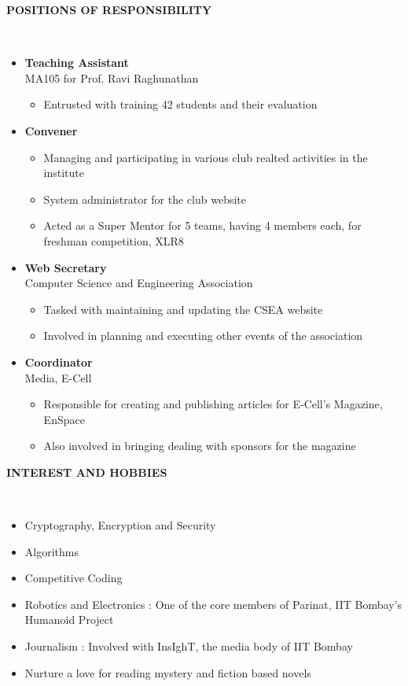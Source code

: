 \documentclass[a4paper,10pt]{article}
\newcommand{\lsep}{-0.5cm}
\newcommand{\resheading}[1]{{\small \colorbox{mygrey}{\begin{minipage}{0.975\textwidth}{\textbf{#1 \vphantom{p\^{E}}}}\end{minipage}}}}
\begin{document}
\resheading{\textbf{POSITIONS OF RESPONSIBILITY} }\\[\lsep]
\begin{itemize}\itemsep 0em
\item {\bf Teaching Assistant} \\
\hspace*{5mm} MA105 for Prof. Ravi Raghunathan
\begin{itemize}
\item Entrusted with training 42 students and their evaluation
\end{itemize}

\item {\bf Convener}  \\
\hspace*{5mm}{\bf Electronics Club}
\begin{itemize}
\itemsep 0em
\item Managing and participating in various club realted activities in the institute
\item System administrator for the club website
\item Acted as a Super Mentor for 5 teams, having 4 members each, for freshman competition, XLR8
\end{itemize}

\item {\bf Web Secretary}  \\
\hspace*{5mm} Computer Science and Engineering Association
\begin{itemize}
\itemsep 0em
\item Tasked with maintaining and updating the CSEA website
\item Involved in planning and executing other events of the association
\end{itemize}

\item {\bf Coordinator}  \\
\hspace*{5mm} Media, E-Cell
\begin{itemize}
\itemsep 0em
\item Responsible for creating and publishing articles for E-Cell's Magazine, EnSpace
\item Also involved in bringing dealing with sponsors for the magazine
\end{itemize}

\end{itemize}

\resheading{\textbf{INTEREST AND HOBBIES} }\\[\lsep]
\begin{itemize}
\itemsep 0em
\item Cryptography, Encryption and Security
\item Algorithms
\item Competitive Coding
\item Robotics and Electronics : One of the core members of Parinat, IIT Bombay's Humanoid Project
\item Journalism : Involved with InsIghT, the media body of IIT Bombay
\item Nurture a love for reading mystery and fiction based novels
\end{itemize}
\end{document}
